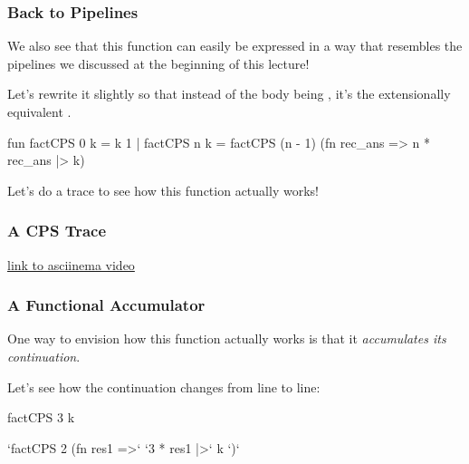 \documentclass[aspectratio=169, handout]{beamer}
\begin{document}
\begin{frame}[fragile]
  \frametitle{Back to Pipelines}

  We also see that this function can easily be expressed in a way that
  resembles the pipelines we discussed at the beginning of this lecture!

  \pause
  \vspace{\fill}

  Let's rewrite it slightly so that instead of the body being ,
  it's the extensionally equivalent .

  \pause
  \begin{codeblock}
    fun factCPS 0 k = k 1
      | factCPS n k = 
          factCPS (n - 1)    (fn rec_ans => 
          n * rec_ans     |> k) 
  \end{codeblock}

  \pause
  \vspace{\fill}

  Let's do a trace to see how this function actually works!
\end{frame}

\begin{frame}[fragile]
  \frametitle{A CPS Trace}

  \begin{center}
    \huge \color{blue} \href{https://asciinema.org/a/WxUSfzU1xOdbJkikgyy6wFJ0l}{link to asciinema video}
\end{center}
\end{frame}

\begin{frame}[fragile]
  \frametitle{A Functional Accumulator}

  One way to envision how this function actually works is that it \textit{accumulates
  its continuation}. 

  \pause
  \vspace{\fill}

  Let's see how the continuation changes from line to line:

  \begin{codeblock}
    factCPS 3 k
  \end{codeblock}

  \pause
  \vspace{\fill}

  \begin{codeblock}
    `factCPS 2    (fn res1 =>`
    `3 * res1  |>` k `)`
  \end{codeblock}
\end{frame}
\end{document}
